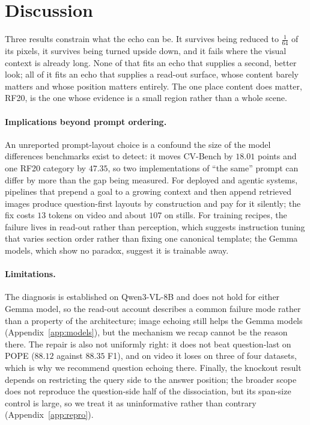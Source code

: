 \section{Discussion}
\label{sec:discussion}

Three results constrain what the echo can be. It survives being reduced to
$\tfrac{1}{64}$ of its pixels, it survives being turned upside down, and it
fails where the visual context is already long. None of that fits an echo that
supplies a second, better look; all of it fits an echo that supplies a read-out
surface, whose content barely matters and whose position matters entirely. The
one place content does matter, RF20, is the one whose evidence is a small region
rather than a whole scene.

\paragraph{Implications beyond prompt ordering.} An unreported prompt-layout
choice is a confound the size of the model differences benchmarks exist to
detect: it moves CV-Bench by $18.01$ points and one RF20 category by $47.35$, so
two implementations of ``the same'' prompt can differ by more than the gap being
measured. For deployed and agentic systems, pipelines that prepend a goal to a
growing context and then append retrieved images produce question-first layouts
by construction and pay for it silently; the fix costs $13$ tokens on video and
about $107$ on stills. For training recipes, the failure lives in read-out rather
than perception, which suggests instruction tuning that varies section order
rather than fixing one canonical template; the Gemma models, which show no
paradox, suggest it is trainable away.

\paragraph{Limitations.} The diagnosis is established on Qwen3-VL-8B and does not
hold for either Gemma model, so the read-out account describes a common failure
mode rather than a property of the architecture; image echoing still helps the
Gemma models (Appendix~\ref{app:models}), but the mechanism we recap cannot be
the reason there. The repair is also not uniformly right: it does not beat
question-last on POPE ($88.12$ against $88.35$ F1), and on video it loses on
three of four datasets, which is why we recommend question echoing there.
Finally, the knockout result depends on restricting the query side to the answer
position; the broader scope does not reproduce the question-side half of the
dissociation, but its span-size control is large, so we treat it as uninformative
rather than contrary (Appendix~\ref{app:repro}).
